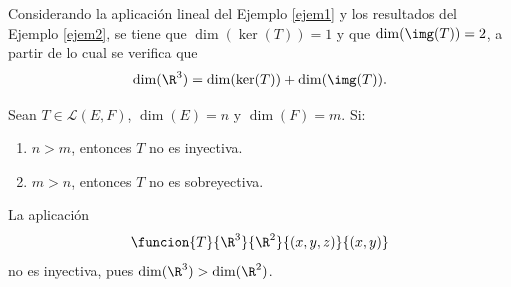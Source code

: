 \documentclass[compacto,10pt]{pubciencias-notas}
\begin{document}
\begin{ejem}\hspace{0pt}
Considerando la aplicación lineal del Ejemplo \ref{ejem1} y los resultados del Ejemplo \ref{ejem2}, se tiene que $\dim(\ker(T)) = 1$ y que $\dim(\img(T)) = 2$, a partir de lo cual se verifica que 
\[
    \dim(\R^{3}) = \dim(\ker(T)) +  \dim(\img(T)).
\]
\end{ejem}

\begin{teo}
Sean $T\in\mathscr{L}(E,F)$, $\dim(E)=n$ y $\dim(F)=m$. Si:
\begin{enumerate}
    \item $n>m$, entonces $T$ no es inyectiva.
    \item $m>n$, entonces $T$ no es sobreyectiva.
\end{enumerate}
\end{teo}

\begin{ejem}\hspace{0pt}
La aplicación
\[
    \funcion{T}{\R^3}{\R^2}{(x,y,z)}{(x,y)}
\]
no es inyectiva, pues $\dim(\R^{3}) > \dim(\R^{2})$. 
\end{ejem}
\end{document}
